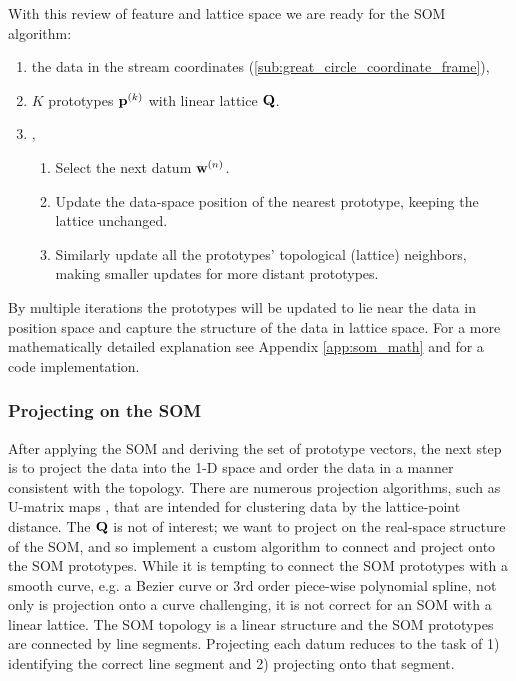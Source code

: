 \documentclass[fleqn,usenatbib]{mnras}
\begin{document}
      With this review of feature and lattice space we are ready for the SOM
      algorithm:

      \label{som_algorithm_steps}
      \begin{enumerate}[label={(\bfseries \arabic*):}, leftmargin=*]
      \itemsep0.5em
        \item {} the data in the stream coordinates
              (\autoref{sub:great_circle_coordinate_frame}),
        \item {} $K$ prototypes $\mathbf{p}^{(k)}$ with linear lattice
              $\mathbf{Q}$.
        \item {},
          \begin{enumerate}[label={(\bfseries \arabic*):}, leftmargin=*]
          \itemsep0.5em
            \item Select the next datum $\mathbf{w}^{(n)}$.
            \item Update the data-space position of the nearest prototype,
            keeping the lattice unchanged.
            \item Similarly update all the prototypes' topological (lattice)
            neighbors, making smaller updates for more distant prototypes.
          \end{enumerate}
      \end{enumerate}

      By multiple iterations the prototypes will be updated to lie near the data
      in position space and capture the structure of the data in lattice space.
      For a more mathematically detailed explanation see Appendix
      \ref{app:som_math} and \trackstream{} for a code implementation.


    \subsubsection{Projecting on the SOM} \label{sub:som_projection}

      After applying the SOM and deriving the set of prototype vectors, the next
      step is to project the data into the 1-D space and order the data in a
      manner consistent with the topology. There are numerous projection
      algorithms, such as U-matrix maps \citep{Ultsch1990}, that are intended
      for clustering data by the lattice-point distance. The $\mathbf{Q}$ is not of
      interest; we want to project on the real-space structure of the SOM, and
      so implement a custom algorithm to connect and project onto the SOM
      prototypes. While it is tempting to connect the SOM prototypes with a
      smooth curve, e.g. a Bezier curve \citep{Bezier1982} or 3rd order
      piece-wise polynomial spline, not only is projection onto a curve
      challenging, it is not correct for an SOM with a linear lattice. The SOM
      topology is a linear structure and the SOM prototypes are connected by
      line segments. Projecting each datum reduces to the task of 1) identifying
      the correct line segment and 2) projecting onto that segment.
\end{document}
